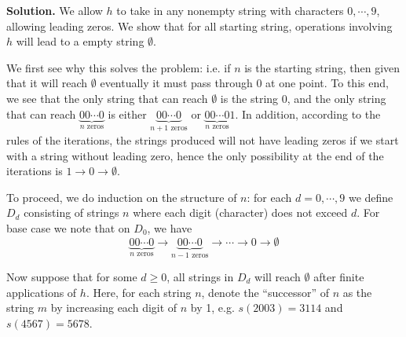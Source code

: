 \documentclass[11pt,a4paper]{article}
\begin{document}
\begin{enumerate}
        \textbf{Solution.} 
        We allow $h$ to take in any nonempty string with characters $0, \cdots, 9$, allowing leading zeros. We show that for all starting string, operations involving $h$ will lead to a empty string $\emptyset$. 
        
        We first see why this solves the problem: i.e. if $n$ is the starting string, then given that it will reach $\emptyset$ eventually it must pass through 0 at one point. 
        To this end, we see that the only string that can reach $\emptyset$ is the string 0, 
        and the only string that can reach $\underbrace{00\cdots 0}_{n\text{ zeros}}$ is either $\underbrace{00\cdots 0}_{n + 1\text{ zeros}}$
        or $\underbrace{00\cdots 0}_{n\text{ zeros}}1$. 
        In addition, according to the rules of the iterations, the strings produced will not have leading zeros if we start with a string without leading zero, 
        hence the only possibility at the end of the iterations is $1\to 0\to\emptyset$. 
        
        To proceed, we do induction on the structure of $n$: 
        for each $d=0, \cdots, 9$ we define $D_d$ consisting of strings $n$ where each digit (character) does not exceed $d$. 
        For base case we note that on $D_0$, we have 
        \[
        \underbrace{00\cdots 0}_{n\text{ zeros}}\to \underbrace{00\cdots 0}_{n - 1\text{ zeros}}\to\cdots \to 0\to\emptyset
        \]
        
        Now suppose that for some $d\ge 0$, all strings in $D_d$ will reach $\emptyset$ after finite applications of $h$. 
        Here, for each string $n$, denote the ``successor'' of $n$ as the string $m$ by increasing each digit of $n$ by 1, 
        e.g. $s(2003)=3114$ and $s(4567)=5678$. 
        

\end{enumerate}
\end{document}
